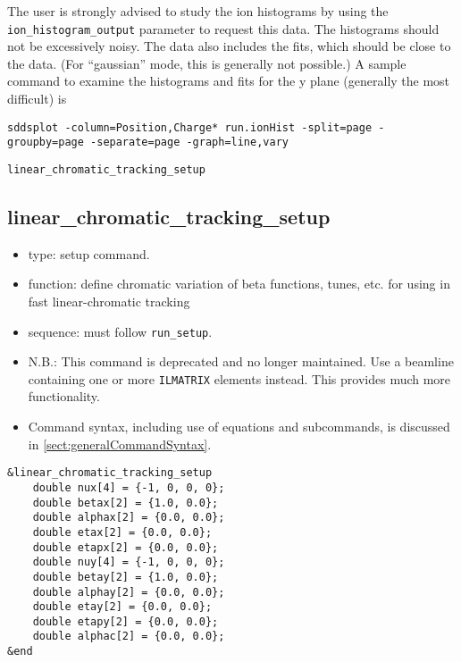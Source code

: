 \documentclass[11pt]{article}
\begin{document}
The user is strongly advised to study the ion histograms by using the \verb|ion_histogram_output| parameter to request
this data.
The histograms should not be excessively noisy.
The data also includes the fits, which should be close to the data.
(For ``gaussian'' mode, this is generally not possible.)
A sample command to examine the histograms and fits for the y plane (generally the most difficult) is
\begin{verbatim}
sddsplot -column=Position,Charge* run.ionHist -split=page -groupby=page -separate=page -graph=line,vary 
\end{verbatim}


\newpage
\begin{center}{\Large\verb|linear_chromatic_tracking_setup|}\end{center}
\subsection{linear\_chromatic\_tracking\_setup \label{subsec:linearchromatictrackingsetup}}

\begin{itemize}
\item type: setup command.
\item function: define chromatic variation of beta functions, tunes, etc. for using in
 fast linear-chromatic tracking
\item sequence: must follow \verb|run_setup|.
\item N.B.: This command is deprecated and no longer maintained. Use a beamline containing one or
  more \verb|ILMATRIX| elements instead. This provides much more functionality.
\item Command syntax, including use of equations and subcommands, is discussed in \ref{sect:generalCommandSyntax}.
\end{itemize}

\begin{verbatim}
&linear_chromatic_tracking_setup
    double nux[4] = {-1, 0, 0, 0};
    double betax[2] = {1.0, 0.0};
    double alphax[2] = {0.0, 0.0};
    double etax[2] = {0.0, 0.0};
    double etapx[2] = {0.0, 0.0};
    double nuy[4] = {-1, 0, 0, 0};
    double betay[2] = {1.0, 0.0};
    double alphay[2] = {0.0, 0.0};
    double etay[2] = {0.0, 0.0};
    double etapy[2] = {0.0, 0.0};
    double alphac[2] = {0.0, 0.0};
&end
\end{verbatim}
\end{document}
